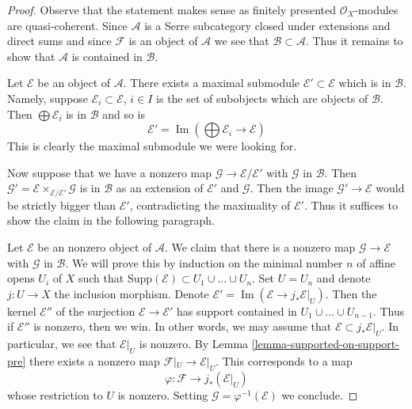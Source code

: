 \documentclass{stacks-project}
\theoremstyle{plain}
\theoremstyle{definition}
\theoremstyle{remark}
\numberwithin{equation}{subsection}
\def\Im{\mathop{\mathrm{Im}}}
\begin{document}
\begin{proof}
Observe that the statement makes sense as finitely presented
$\mathcal{O}_X$-modules are quasi-coherent.
Since $\mathcal{A}$ is a Serre subcategory closed under extensions and
direct sums and since $\mathcal{F}$ is an object of $\mathcal{A}$
we see that $\mathcal{B} \subset \mathcal{A}$. Thus it remains to
show that $\mathcal{A}$ is contained in $\mathcal{B}$.

\medskip\noindent
Let $\mathcal{E}$ be an object of $\mathcal{A}$. There exists
a maximal submodule $\mathcal{E}' \subset \mathcal{E}$
which is in $\mathcal{B}$. Namely, suppose
$\mathcal{E}_i \subset \mathcal{E}$, $i \in I$ is the set of
subobjects which are objects of $\mathcal{B}$. Then
$\bigoplus \mathcal{E}_i$ is in $\mathcal{B}$ and so is
$$
\mathcal{E}' = \Im(\bigoplus \mathcal{E}_i \longrightarrow \mathcal{E})
$$
This is clearly the maximal submodule we were looking for.

\medskip\noindent
Now suppose that we have a nonzero map
$\mathcal{G} \to \mathcal{E}/\mathcal{E}'$
with $\mathcal{G}$ in $\mathcal{B}$. Then
$\mathcal{G}' = \mathcal{E} \times_{\mathcal{E}/\mathcal{E}'} \mathcal{G}$
is in $\mathcal{B}$ as an extension of $\mathcal{E}'$ and $\mathcal{G}$.
Then the image $\mathcal{G}' \to \mathcal{E}$ would be strictly
bigger than $\mathcal{E}'$, contradicting the maximality of $\mathcal{E}'$.
Thus it suffices to show the claim in the following paragraph.

\medskip\noindent
Let $\mathcal{E}$ be an nonzero object of $\mathcal{A}$. We claim that there
is a nonzero map $\mathcal{G} \to \mathcal{E}$ with $\mathcal{G}$ in
$\mathcal{B}$. We will prove this by induction on the minimal
number $n$ of affine opens $U_i$ of $X$ such that
$\text{Supp}(\mathcal{E}) \subset U_1 \cup \ldots \cup U_n$.
Set $U = U_n$ and denote $j : U \to X$ the inclusion morphism.
Denote $\mathcal{E}' = \Im(\mathcal{E} \to j_*\mathcal{E}|_U)$.
Then the kernel $\mathcal{E}''$ of the surjection
$\mathcal{E} \to \mathcal{E}'$ has support contained in
$U_1 \cup \ldots \cup U_{n - 1}$. Thus if $\mathcal{E}''$ is nonzero,
then we win. In other words, we may assume that
$\mathcal{E} \subset j_*\mathcal{E}|_U$.
In particular, we see that $\mathcal{E}|_U$ is nonzero.
By Lemma \ref{lemma-supported-on-support-pre}
there exists a nonzero map $\mathcal{F}|_U \to \mathcal{E}|_U$.
This corresponds to a map
$$
\varphi : \mathcal{F} \longrightarrow j_*(\mathcal{E}|_U)
$$
whose restriction to $U$ is nonzero.
Setting $\mathcal{G} = \varphi^{-1}(\mathcal{E})$ we conclude.
\end{proof}
\end{document}
